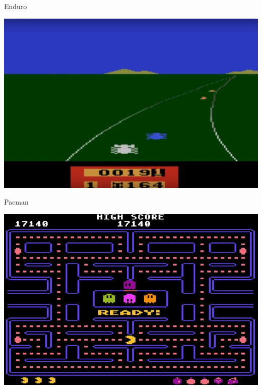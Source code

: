 \begin{multicols}{2}
\vfil\null
\pagebreak

\pagecolor{black}
{\color{white}Enduro}

	\begin{center}
	\includegraphics[width=\linewidth]{./IMG/enduroatari2600image1111.jpg}
\end{center}

\vfil\null
\columnbreak

{\color{white}Pacman}
\begin{center}
	\includegraphics[width=\linewidth]{./IMG/maxresdefault.jpg}
\end{center}

\end{multicols}

\vfil\null
\pagebreak

\pagecolor{white}